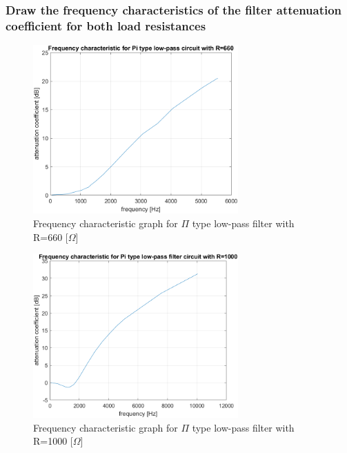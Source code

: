 \documentclass[]{scrartcl}
\begin{document}
\subsubsection{Draw the frequency characteristics of the filter attenuation coefficient for both load resistances}

\begin{figure}[H]
	\centering
	\includegraphics[width=0.7\textwidth]{Pictures/low_filter_660.png}
	\caption{Frequency characteristic graph for $\Pi$ type low-pass filter with R=660 [$\Omega$]}
	\label{fig:R=660 char}
\end{figure}

\begin{figure}[H]
	\centering
	\includegraphics[width=0.7\textwidth]{Pictures/low_filter_1000.png}
	\caption{Frequency characteristic graph for $\Pi$ type low-pass filter with R=1000 [$\Omega$]}
	\label{fig:R=1000 char}
\end{figure}
\end{document}
